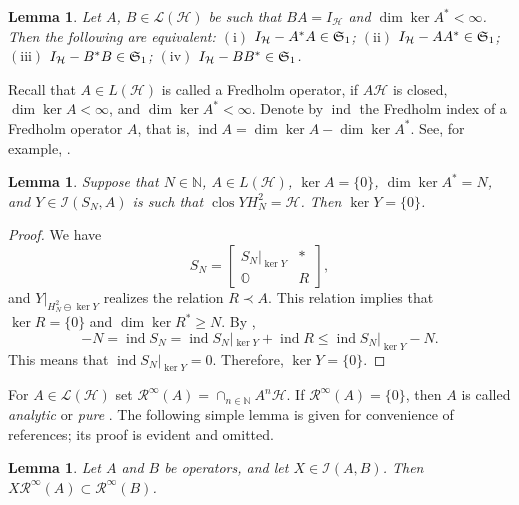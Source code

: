 \documentclass[a4paper,oneside,11pt]{amsart}
\numberwithin{equation}{section}
\theoremstyle{plain}
\newtheorem{lemma}[theorem]{Lemma}
\theoremstyle{definition}
\begin{document}
\begin{lemma}\label{lemdefect} Let $A$, $B\in\mathcal L(\mathcal H)$ be such that $BA=I_{\mathcal H}$ and $\dim\ker A^*<\infty$. 
Then the following are equivalent: $\mathrm{(i)}$ $ I_{\mathcal H}-A^*A\in\frak S_1$; $\mathrm{(ii)}$ 
 $I_{\mathcal H}-AA^*\in\frak S_1$; $\mathrm{(iii)}$ $I_{\mathcal H}-B^*B\in\frak S_1$;
$\mathrm{(iv)}$  $I_{\mathcal H}-BB^*\in\frak S_1$. 
\end{lemma}

Recall that  $A\in L(\mathcal H)$ is called a Fredholm operator, if $A\mathcal H$ is closed, $\dim\ker A<\infty$, and 
$\dim\ker A^*<\infty$.   
 Denote by $\operatorname{ind}$ the Fredholm index of a Fredholm operator $A$,  that is, 
$\operatorname{ind}A=\dim\ker A-\dim\ker A^*$. See, for example, {\cite[Ch. XI]{conway}}.

\begin{lemma} \label{lemfred} Suppose that $N\in\mathbb N$, $A\in L(\mathcal H)$, $\ker A=\{0\}$, $\dim\ker A^*=N$, 
and $Y\in\mathcal I(S_N,A)$ is such that $\operatorname{clos}YH^2_N=\mathcal H$.
Then $\ker Y=\{0\}$.
\end{lemma}

\begin{proof} We have 
 \begin{equation*}S_N=\left[\begin{matrix}S_N|_{\ker Y} & * \\ \mathbb O & R\end{matrix}\right], 
\end{equation*}
and $Y|_{H^2_N\ominus \ker Y}$ realizes the relation $R\prec A$. This relation implies that $\ker R=\{0\}$ and 
$\dim\ker R^*\geq N$. By {\cite[Theorem  XI.3.7]{conway}},  
 \begin{equation*} -N=\operatorname{ind}S_N=\operatorname{ind}S_N|_{\ker Y}+\operatorname{ind}R\leq
\operatorname{ind}S_N|_{\ker Y}-N.\end{equation*}
This means that $\operatorname{ind}S_N|_{\ker Y} =0$. Therefore, $\ker Y=\{0\}$.
\end{proof}



For $A\in\mathcal L(\mathcal H)$ set $\mathcal R^\infty(A)=\cap_{n\in\mathbb N}A^n\mathcal H$. 
If $\mathcal R^\infty(A)=\{0\}$, then $A$ is called \emph{analytic} \cite{shimorin} or \emph{pure} \cite{olofsson}. 
The following simple lemma is given for convenience of references; its proof is evident and  omitted.

\begin{lemma}\label{lemaabbxx}  Let $A$ and  $B$ be  operators, and let $X\in\mathcal I(A,B)$. 
Then $X\mathcal R^\infty(A)\subset\mathcal R^\infty(B)$.
\end{lemma}
\end{document}
